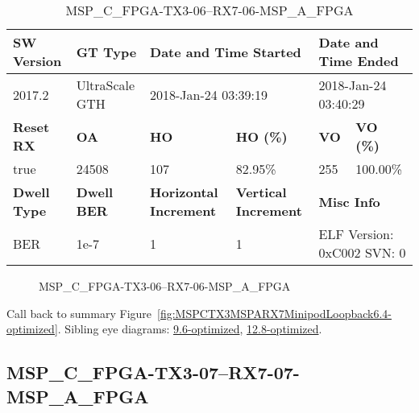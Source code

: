 \begin{table}[h]
\centering
\caption{MSP\_C\_FPGA-TX3-06--RX7-06-MSP\_A\_FPGA}
\label{tab:MSPCFPGATX306RX706MSPAFPGA6.4-optimized}
\begin{tabular}{@{}|l|l|l|l|l|l|@{}}
\toprule
\textbf{SW Version}                & \textbf{GT Type}   & \multicolumn{2}{l|}{\textbf{Date and Time Started}}            & \multicolumn{2}{l|}{\textbf{Date and Time Ended}}        \\ \midrule
2017.2                       & UltraScale GTH          & \multicolumn{2}{l|}{2018-Jan-24 03:39:19}                   & \multicolumn{2}{l|}{2018-Jan-24 03:40:29}               \\ \midrule
\textbf{Reset RX}                  & \textbf{OA} & \textbf{HO}   & \textbf{HO (\%)} & \textbf{VO} & \textbf{VO (\%)} \\ \midrule
true & 24508        & 107          & 82.95\%        & 255        & 100.00\%       \\ \midrule
\textbf{Dwell Type}                & \textbf{Dwell BER} & \textbf{Horizontal Increment} & \textbf{Vertical Increment}    & \multicolumn{2}{l|}{\textbf{Misc Info}}                  \\ \midrule
BER                            & 1e-7        & 1        & 1           & \multicolumn{2}{l|}{ELF Version: 0xC002 SVN: 0}                         \\ \bottomrule
\end{tabular}
\end{table}

\begin{figure}[h]
\caption{MSP\_C\_FPGA-TX3-06--RX7-06-MSP\_A\_FPGA} \label{fig:MSPCFPGATX306RX706MSPAFPGA6.4-optimized}
\end{figure}

Call back to summary Figure~\ref{fig:MSPCTX3MSPARX7MinipodLoopback6.4-optimized}.
Sibling eye diagrams: \hyperref[sec:MSPCFPGATX306RX706MSPAFPGA9.6-optimized]{9.6-optimized}, \hyperref[sec:MSPCFPGATX306RX706MSPAFPGA12.8-optimized]{12.8-optimized}.

\clearpage
\newpage


\subsection{MSP\_C\_FPGA-TX3-07--RX7-07-MSP\_A\_FPGA}\label{sec:MSPCFPGATX307RX707MSPAFPGA6.4-optimized}

